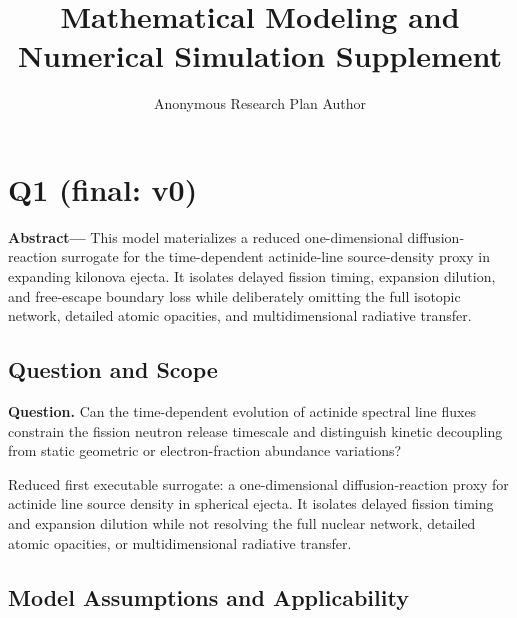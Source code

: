 \documentclass[11pt]{article}
\title{Mathematical Modeling and Numerical Simulation Supplement}
\author{Anonymous Research Plan Author}
\date{}
\begin{document}
\setlength{\emergencystretch}{3em}

\maketitle

\section{Q1 (final: v0)}

\noindent\textbf{Abstract—} This model materializes a reduced one-dimensional diffusion-reaction surrogate for the time-dependent actinide-line source-density proxy in expanding kilonova ejecta. It isolates delayed fission timing, expansion dilution, and free-escape boundary loss while deliberately omitting the full isotopic network, detailed atomic opacities, and multidimensional radiative transfer.

\subsection{Question and Scope}

\noindent\textbf{Question.} Can the time-dependent evolution of actinide spectral line fluxes constrain the fission neutron release timescale and distinguish kinetic decoupling from static geometric or electron-fraction abundance variations?



Reduced first executable surrogate: a one-dimensional diffusion-reaction proxy for actinide line source density in spherical ejecta. It isolates delayed fission timing and expansion dilution while not resolving the full nuclear network, detailed atomic opacities, or multidimensional radiative transfer.

\subsection{Model Assumptions and Applicability}
\end{document}
